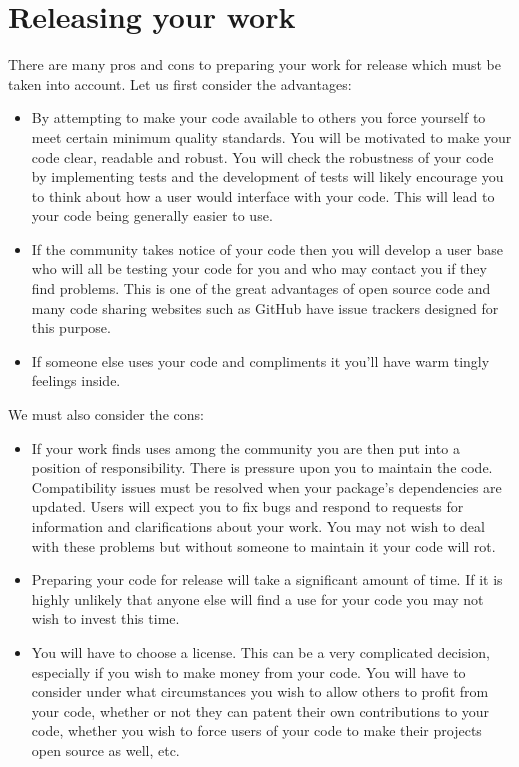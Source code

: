 \documentclass{article}
\begin{document}
\section*{Releasing your work}
There are many pros and cons to preparing your work for release which must be taken into account. Let us first consider the advantages:
\begin{itemize}
	\item By attempting to make your code available to others you force yourself to meet certain minimum quality standards. You will be motivated to make your code clear, readable and robust. You will check the robustness of your code by implementing tests and the development of tests will likely encourage you to think about how a user would interface with your code. This will lead to your code being generally easier to use.
	\item If the community takes notice of your code then you will develop a user base who will all be testing your code for you and who may contact you if they find problems. This is one of the great advantages of open source code and many code sharing websites such as GitHub have issue trackers designed for this purpose.
    \item If someone else uses your code and compliments it you'll have warm tingly feelings inside.
\end{itemize}
We must also consider the cons:
\begin{itemize}
	\item If your work finds uses among the community you are then put into a position of responsibility. There is pressure upon you to maintain the code. Compatibility issues must be resolved when your package's dependencies are updated. Users will expect you to fix bugs and respond to requests for information and clarifications about your work. You may not wish to deal with these problems but without someone to maintain it your code will rot.
	\item Preparing your code for release will take a significant amount of time. If it is highly unlikely that anyone else will find a use for your code you may not wish to invest this time.
	\item You will have to choose a license. This can be a very complicated decision, especially if you wish to make money from your code. You will have to consider under what circumstances you wish to allow others to profit from your code, whether or not they can patent their own contributions to your code, whether you wish to force users of your code to make their projects open source as well, etc.
\end{itemize}
\end{document}
